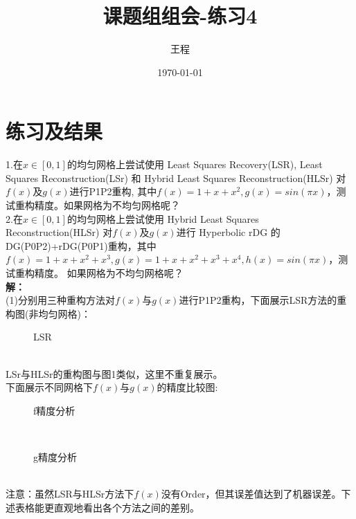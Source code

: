 \documentclass[a4paper,11pt,UTF8]{article}%
\theoremstyle{plain}
\begin{document}
	\title{\heiti 课题组组会-练习4}
	\author{王程 }
	\date{\today}
	\maketitle
	
	\section{练习及结果}
	1.在$x\in \left[0,1\right]$的均匀网格上尝试使用 Least Squares Recovery(LSR), Least Squares Reconstruction(LSr) 和 Hybrid Least Squares Reconstruction(HLSr) 对$f\left(x\right)$及$g\left(x\right)$进行P1P2重构, 其中$f\left(x\right)=1+x+x^2,g\left(x\right)=sin\left(\pi x\right)$，测试重构精度。如果网格为不均匀网格呢？\\
	\indent 2.在$x\in \left[0,1\right]$的均匀网格上尝试使用 Hybrid Least Squares Reconstruction(HLSr) 对$f\left(x\right)$及$g\left(x\right)$进行 Hyperbolic rDG 的 DG(P0P2)+rDG(P0P1)重构，其中$f\left(x\right)=1+x+x^2+x^3,g\left(x\right)=1+x+x^2+x^3+x^4,h\left(x\right)=sin\left(\pi x\right)$，测试重构精度。 如果网格为不均匀网格呢？\\
	
	\textbf{解：}\\
	\indent(1)分别用三种重构方法对$f\left(x\right)$与$g\left(x\right)$进行P1P2重构，下面展示LSR方法的重构图(非均匀网格)：\\
		\begin{figure}[!h]
		\centering
		\hfill
		\caption{LSR}
	\end{figure}\\
\indent LSr与HLSr的重构图与图1类似，这里不重复展示。\\
\clearpage
下面展示不同网格下$f\left(x\right)$与$g\left(x\right)$的精度比较图:\\
		\begin{figure}[!h]
	\centering
	\hfill
	\caption{f精度分析}
\end{figure}\\
		\begin{figure}[!h]
	\centering
	\hfill
	\caption{g精度分析}
\end{figure}\\
注意：虽然LSR与HLSr方法下$f\left(x\right)$没有Order，但其误差值达到了机器误差。下述表格能更直观地看出各个方法之间的差别。
\clearpage
\end{document}

